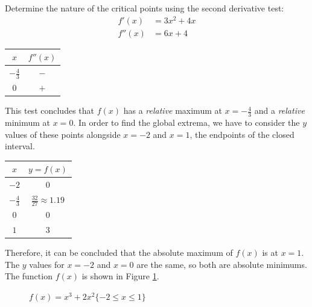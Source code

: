 \noindent Determine the nature of the critical points using the second derivative test:
\begin{align*}
	f'(x) &= 3x^2 + 4x \\
	f''(x) &= 6x + 4
\end{align*}
\begin{table}[H]
	\centering
	\begin{tabular}{|c|c|}
		\hline
		$x$ & $f''(x)$ \\
		\hline \hline
		$-\frac{4}{3}$ & $-$ \\
		\hline
		$0$ & $+$ \\
		\hline
	\end{tabular}
\end{table}

\noindent This test concludes that $f(x)$ has a \textit{relative} maximum at $x = -\frac{4}{3}$ and a \textit{relative} minimum at $x = 0$. In order to find the global extrema, we have to consider the $y$ values of these points alongside $x = -2$ and $x = 1$, the endpoints of the closed interval.
\begin{table}[H]
	\centering
	\begin{tabular}{|c|c|}
		\hline
		$x$ & $y = f(x)$ \\
		\hline \hline
		$-2$ & $0$ \\
		\hline
		$-\frac{4}{3}$ & $\frac{32}{27} \approx 1.19$ \\
		\hline
		$0$ & $0$ \\
		\hline
		$1$ & $3$ \\
		\hline
	\end{tabular}
\end{table}

\noindent Therefore, it can be concluded that the absolute maximum of $f(x)$ is at $x = 1$. The $y$ values for $x = -2$ and $x = 0$ are the same, so both are absolute minimums. The function $f(x)$ is shown in Figure \ref{fig:global_extrema}.
\begin{figure}[H]
	\centering
	\caption{$f(x) = x^3 + 2x^2 \{ -2 \leq x \leq 1 \}$}
	\label{fig:global_extrema}
\end{figure}

